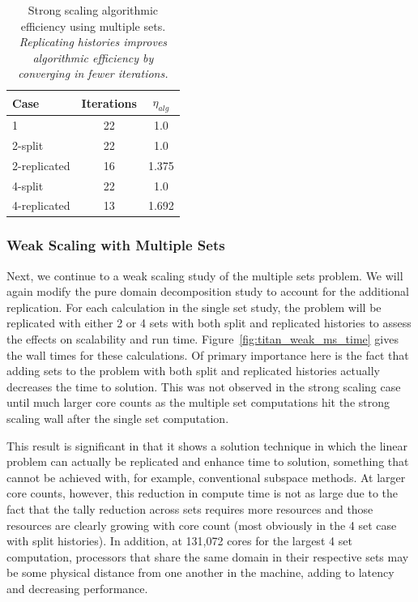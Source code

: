 \documentclass{snamc2013}
\begin{document}
\begin{table}[H]
  \begin{center}
    \begin{tabular}{lcc}\hline\hline
      \multicolumn{1}{l}{Case}& 
      \multicolumn{1}{c}{Iterations}&
      \multicolumn{1}{c}{$\eta_{alg}$} \\\hline
      1 & 22 & 1.0 \\
      2-split & 22 & 1.0 \\
      2-replicated & 16 & 1.375 \\
      4-split & 22 & 1.0 \\
      4-replicated & 13 & 1.692 \\
      \hline\hline
    \end{tabular}
  \end{center}
  \caption{Strong scaling algorithmic efficiency using multiple
    sets. \textit{Replicating histories improves algorithmic
      efficiency by converging in fewer iterations.}}
  \label{tab:ms_strong_alg_eff}
\end{table}

\subsubsection{Weak Scaling with Multiple Sets}
\label{subsubsec:ms_weak}
Next, we continue to a weak scaling study of the multiple sets
problem. We will again modify the pure domain decomposition study to
account for the additional replication. For each calculation in the
single set study, the problem will be replicated with either 2 or 4
sets with both split and replicated histories to assess the effects on
scalability and run time. Figure~\ref{fig:titan_weak_ms_time} gives
the wall times for these calculations. Of primary importance here is
the fact that adding sets to the problem with both split and
replicated histories actually decreases the time to solution. This was
not observed in the strong scaling case until much larger core counts
as the multiple set computations hit the strong scaling wall after the
single set computation.

This result is significant in that it shows a solution technique in
which the linear problem can actually be replicated and enhance time
to solution, something that cannot be achieved with, for example,
conventional subspace methods. At larger core counts, however, this
reduction in compute time is not as large due to the fact that the
tally reduction across sets requires more resources and those
resources are clearly growing with core count (most obviously in the 4
set case with split histories). In addition, at 131,072 cores for the
largest 4 set computation, processors that share the same domain in
their respective sets may be some physical distance from one another
in the machine, adding to latency and decreasing performance.
\end{document}
